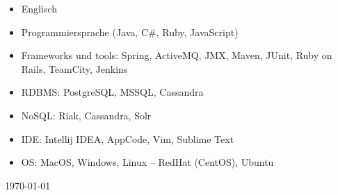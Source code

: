 \documentclass[german,noflag,nologo,booktabs,totpages,helvetica,narrow]{europecv}
\makeatletter
\newenvironment{cvenumerate}{\begin{minipage}[t]{\ecv@rightcolwidth}\begin{itemize}[leftmargin=*,itemsep=0em,parsep=0em]}{\end{itemize}\end{minipage}}
\makeatother
\begin{document}
\begin{europecv}
{\begin{cvenumerate}
	\item Englisch 
\end{cvenumerate}}

	{\begin{cvenumerate}
		\item Programmiersprache (Java, C\#, Ruby, JavaScript)
		\item Frameworks und tools: Spring, ActiveMQ, JMX, Maven,
JUnit, Ruby on Rails, TeamCity, Jenkins
		\item RDBMS: PostgreSQL, MSSQL, Cassandra
		\item NoSQL: Riak, Cassandra, Solr
		\item IDE: Intellij IDEA, AppCode, Vim, Sublime Text
		\item OS: MacOS, Windows, Linux – RedHat (CentOS), Ubuntu
	\end{cvenumerate}}
\end{europecv}
\vspace{15pt}
\hfill \today
\end{document}

